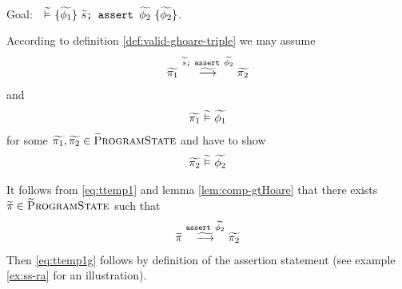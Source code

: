 \begin{proofatend}~\\
    Goal: ${~} \,\,\widetilde{\vDash}\,\, \{{\widetilde{\phi_1}}\} ~{\textup{\texttt{{$\widetilde{s}$};~{\textup{\texttt{assert $\widetilde{\phi_2}$}}}}}}~ \{{\widetilde{\phi_2}}\}$.
    
    According to definition \ref{def:valid-ghoare-triple} we may assume
    \begin{align}
    \label{eq:ttemp1}
    \gsstepConsume{\sSeq{$\grad{s}$}{\sAssert{$\grad{\phi_2}$}}}{\grad{\pi_1}}{\grad{\pi_2}}
    \end{align}
    and
    \begin{align}
    \widetilde{\pi_1} \,\,\widetilde{\vDash}\,\, \widetilde{\phi_1}
    \end{align}
    for some $\widetilde{\pi_1}, \widetilde{\pi_2} \in \textup{\textsc{\ensuremath{\widetilde{\text{P}}}rogramState}}$ and have to show
    \begin{align}
    \label{eq:ttemp1g}
    \evalgphiGen{\grad{\pi_2}}{\grad{\phi_2}}
    \end{align}
    
    It follows from \ref{eq:ttemp1} and lemma \ref{lem:comp-gtHoare} that there exists $\widetilde{\pi} \in \textup{\textsc{\ensuremath{\widetilde{\text{P}}}rogramState}}$ such that
    \begin{align}
    \label{eq:ttemp2}
    \gsstepConsume{\sAssert{$\grad{\phi_2}$}}{\grad{\pi}}{\grad{\pi_2}}
    \end{align}
    Then \ref{eq:ttemp1g} follows by definition of the assertion statement (see example \ref{ex:ss-ra} for an illustration).
\end{proofatend}

